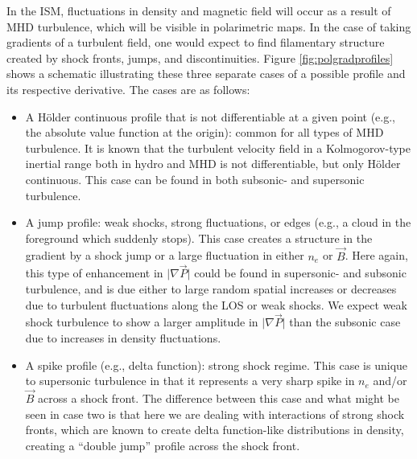 \documentclass[a4paper,10pt]{article}
\begin{document}
{\noindent}In the ISM, fluctuations in density and magnetic field will occur as a result of MHD turbulence, which will be visible in polarimetric maps. In the case of taking gradients of a turbulent field, one would expect to find filamentary structure created by shock fronts, jumps, and discontinuities. Figure \ref{fig:polgradprofiles} shows a schematic illustrating these three separate cases of a possible profile and its respective derivative. The cases are as follows:

\begin{itemize}
    \item A H\"older continuous profile that is not differentiable at a given point (e.g., the absolute value function at the origin): common for all types of MHD turbulence. It is known that the turbulent velocity field in a Kolmogorov-type inertial range both in hydro and MHD is not differentiable, but only H\"older continuous. This case can be found in both subsonic- and supersonic turbulence.
    \item A jump profile: weak shocks, strong fluctuations, or edges (e.g., a cloud in the foreground which suddenly stops). This case creates a structure in the gradient by a shock jump or a large fluctuation in either $n_e$ or $\vec{B}$. Here again, this type of enhancement in $\lvert\nabla\vec{P}\rvert$ could be found in supersonic- and subsonic turbulence, and is due either to large random spatial increases or decreases due to turbulent fluctuations along the LOS or weak shocks. We expect weak shock turbulence to show a larger amplitude in $\lvert\nabla\vec{P}\rvert$ than the subsonic case due to increases in density fluctuations.
    \item A spike profile (e.g., delta function): strong shock regime. This case is unique to supersonic turbulence in that it represents a very sharp spike in $n_e$ and/or $\vec{B}$ across a shock front. The difference between this case and what might be seen in case two is that here we are dealing with interactions of strong shock fronts, which are known to create delta function-like distributions in density, creating a ``double jump'' profile across the shock front.
\end{itemize}
\end{document}
